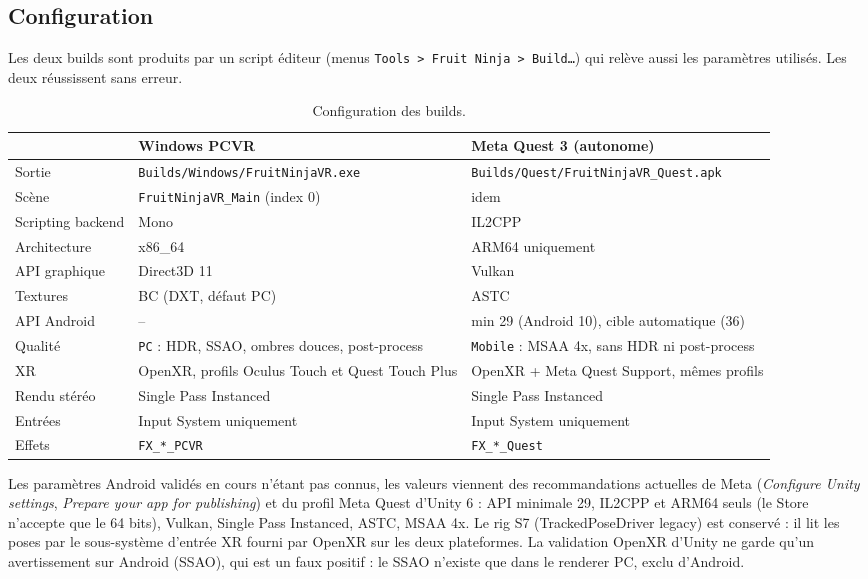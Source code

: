 \documentclass[11pt,a4paper]{article}
\newcommand{\fichier}[1]{\texttt{\small #1}}
\begin{document}
\subsection{Configuration}

Les deux builds sont produits par un script éditeur (menus \texttt{Tools > Fruit Ninja > Build\ldots}) qui
relève aussi les paramètres utilisés. Les deux réussissent sans erreur.

\begin{table}[H]
\centering\small
\caption{Configuration des builds.}
\begin{tabularx}{\textwidth}{@{}P{3.3cm}LL@{}}
\toprule
 & Windows PCVR & Meta Quest 3 (autonome) \\
\midrule
Sortie & \fichier{Builds/Windows/\allowbreak FruitNinjaVR.exe} & \fichier{Builds/Quest/\allowbreak FruitNinjaVR\_Quest.apk} \\
Scène & \texttt{FruitNinjaVR\_Main} (index 0) & idem \\
Scripting backend & Mono & IL2CPP \\
Architecture & x86\_64 & ARM64 uniquement \\
API graphique & Direct3D 11 & Vulkan \\
Textures & BC (DXT, défaut PC) & ASTC \\
API Android & -- & min 29 (Android 10), cible automatique (36) \\
Qualité & \texttt{PC} : HDR, SSAO, ombres douces, post-process & \texttt{Mobile} : MSAA 4x, sans HDR ni post-process \\
XR & OpenXR, profils Oculus Touch et Quest Touch Plus & OpenXR + Meta Quest Support, mêmes profils \\
Rendu stéréo & Single Pass Instanced & Single Pass Instanced \\
Entrées & Input System uniquement & Input System uniquement \\
Effets & \texttt{FX\_*\_PCVR} & \texttt{FX\_*\_Quest} \\
\bottomrule
\end{tabularx}
\end{table}

Les paramètres Android validés en cours n'étant pas connus, les valeurs viennent des recommandations
actuelles de Meta (\emph{Configure Unity settings}, \emph{Prepare your app for publishing}) et du profil
Meta Quest d'Unity 6 : API minimale 29, IL2CPP et ARM64 seuls (le Store n'accepte que le 64 bits),
Vulkan, Single Pass Instanced, ASTC, MSAA 4x. %
Le rig S7 (TrackedPoseDriver legacy) est conservé : il lit les poses par le sous-système d'entrée XR
fourni par OpenXR sur les deux plateformes. La validation OpenXR d'Unity ne garde qu'un avertissement sur
Android (SSAO), qui est un faux positif : le SSAO n'existe que dans le renderer PC, exclu d'Android.
\end{document}
